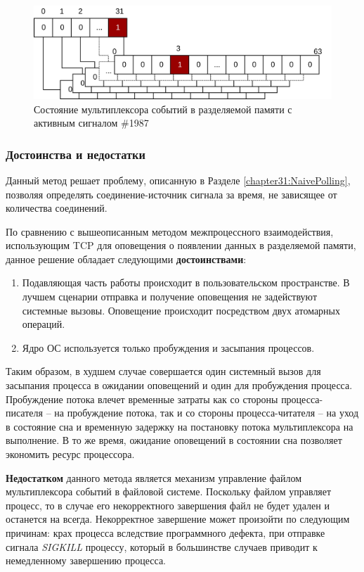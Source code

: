 \begin{figure}[!h]
\caption{Состояние мультиплексора событий в разделяемой памяти с активным сигналом \#1987}
\label{chapter31:Mux1987State}
\includegraphics[width=\textwidth]{../../graphics/schemes/futexready}
\end{figure}

\subsubsection{Достоинства и недостатки}

Данный метод решает проблему, описанную в Разделе \ref{chapter31:NaivePolling}, позволяя определять соединение-источник сигнала за время, не зависящее от количества соединений.

По сравнению с вышеописанным методом межпроцессного взаимодействия, использующим TCP для оповещения о появлении данных в разделяемой памяти, данное решение обладает следующими \textbf{достоинствами}:
\begin{enumerate}
\item Подавляющая часть работы происходит в пользовательском пространстве. В лучшем сценарии отправка и получение оповещения не задействуют системные вызовы. Оповещение происходит посредством двух атомарных операций.
\item Ядро ОС используется только пробуждения и засыпания процессов.
\end{enumerate}

Таким образом, в худшем случае совершается один системный вызов для засыпания процесса в ожидании оповещений и один для пробуждения процесса. Пробуждение потока влечет временные затраты как со стороны процесса-писателя -- на пробуждение потока, так и со стороны процесса-читателя -- на уход в состояние сна и временную задержку на постановку потока мультиплексора на выполнение. В то же время, ожидание оповещений в состоянии сна позволяет экономить ресурс процессора.

\textbf{Недостатком} данного метода является механизм управление файлом мультиплексора событий в файловой системе. Поскольку файлом управляет процесс, то в случае его некорректного завершения файл не будет удален и останется на всегда. Некорректное завершение может произойти по следующим причинам: крах процесса вследствие программного дефекта, при отправке сигнала \textit{SIGKILL} процессу, который в большинстве случаев приводит к немедленному завершению процесса.

